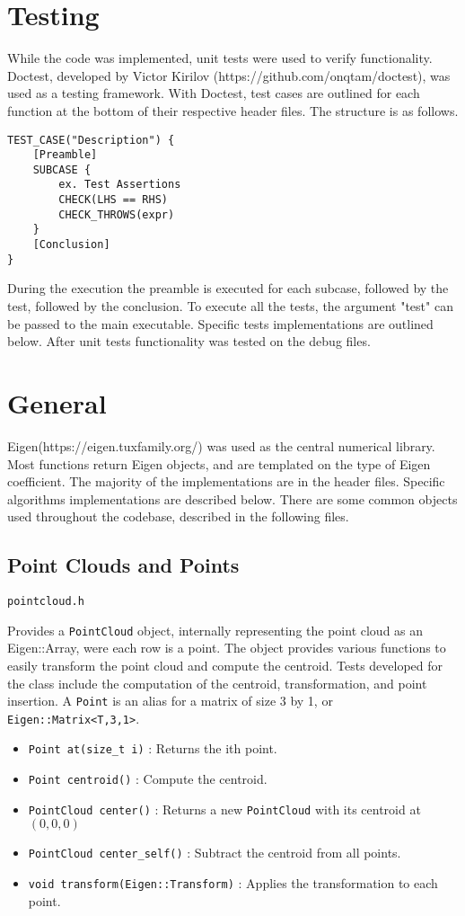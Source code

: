 \documentclass[letterpaper, 11pt]{report}
\begin{document}
\section{Testing}
While the code was implemented, unit tests were used to verify functionality. Doctest, developed by Victor Kirilov (https://github.com/onqtam/doctest), was used as a testing framework. With Doctest, test cases are outlined for each function at the bottom of their respective header files. The structure is as follows.
\begin{verbatim}
TEST_CASE("Description") {
    [Preamble]
    SUBCASE {
        ex. Test Assertions
        CHECK(LHS == RHS)
        CHECK_THROWS(expr)
    } 
    [Conclusion]
}
\end{verbatim}

During the execution the preamble is executed for each subcase, followed by the test, followed by the conclusion. To execute all the tests, the argument "test" can be passed to the main executable. Specific tests implementations are outlined below. After unit tests functionality was tested on the debug files.

\section{General}
Eigen(https://eigen.tuxfamily.org/) was used as the central numerical library. Most functions return Eigen objects, and are templated on the type of Eigen coefficient.
The majority of the implementations are in the header files. Specific algorithms implementations are described below. There are some common objects used throughout the codebase, described in the following files.
\subsection{Point Clouds and Points}
\begin{verbatim}
pointcloud.h
\end{verbatim}
Provides a \texttt{PointCloud} object, internally representing the point cloud as an Eigen::Array, were each row is a point. The object provides various functions to easily transform the point cloud and compute the centroid. Tests developed for the class include the computation of the centroid, transformation, and point insertion. A \texttt{Point} is an alias for a matrix of size 3 by 1, or \texttt{Eigen::Matrix<T,3,1>}.
\begin{itemize}
\item \texttt{Point at(size\_t i)} : Returns the ith point.
\item \texttt{Point centroid()} : Compute the centroid.
\item \texttt{PointCloud center()} : Returns a new \texttt{PointCloud} with its centroid at $(0,0,0)$
\item \texttt{PointCloud center\_self()} : Subtract the centroid from all points.
\item \texttt{void transform(Eigen::Transform)} : Applies the transformation to each point.
\end{itemize}
\end{document}
